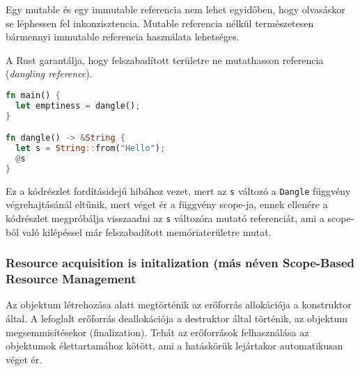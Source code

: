 Egy mutable és egy immutable referencia nem lehet egyidőben, hogy olvasáskor se léphessen fel inkonzisztencia. Mutable referencia nélkül természetesen bármennyi immutable referencia használata lehetséges.

A Rust garantálja, hogy felszabadított területre ne mutathasson referencia (\textit{dangling reference}).
\begin{lstlisting}[language=Rust, style=boxed]
fn main() {
  let emptiness = dangle();
}

fn dangle() -> &String {
  let s = String::from("Hello");
  @s
}
\end{lstlisting}
Ez a kódrészlet fordításidejű hibához vezet, mert az \lstinline{s} változó a \lstinline{Dangle} függvény végrehajtásánál eltűnik, mert véget ér a függvény scope-ja, ennek ellenére a kódrészlet megpróbálja visszaadni az \lstinline{s} változóra mutató referenciát, ami a scope-ból való kilépéssel már felszabadított memóriaterületre mutat.

\subsubsection{Resource acquisition is initalization (más néven Scope-Based Resource Management}
Az objektum létrehozása alatt megtörténik az erőforrás allokációja a konstruktor által. A lefoglalt erőforrás deallokációja a destruktor által történik, az objektum megsemmisítésekor (finalization).  Tehát az erőforrások felhasználása az objektumok élettartamához kötött, ami a hatáskörük lejártakor automatikusan véget ér.

